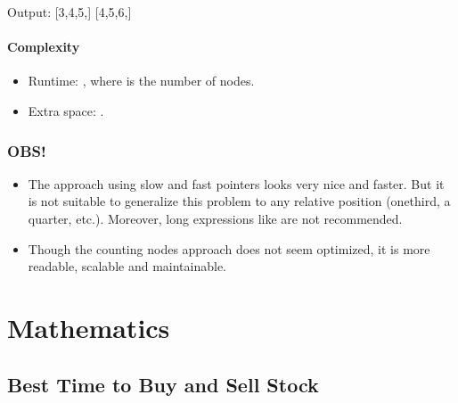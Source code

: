 \documentclass[letterpaper,12pt,english]{book}
\begin{document}
\begin{sphinxVerbatim}[commandchars=\\\{\}]
Output:
[3,4,5,]
[4,5,6,]
\end{sphinxVerbatim}


\subsubsection{Complexity}
\label{\detokenize{Two_Pointers/08_TP_876_Middle_of_the_Linked_List:id2}}\begin{itemize}
\item {} 
\sphinxAtStartPar
Runtime: , where  is the number of nodes.

\item {} 
\sphinxAtStartPar
Extra space: .

\end{itemize}


\subsection{OBS!}
\label{\detokenize{Two_Pointers/08_TP_876_Middle_of_the_Linked_List:obs}}\begin{itemize}
\item {} 
\sphinxAtStartPar
The approach using slow and fast pointers looks very nice and faster. But it is not suitable to generalize this problem to any relative position (one\sphinxhyphen{}third, a quarter, etc.). Moreover, long expressions like  are not recommended.

\item {} 
\sphinxAtStartPar
Though the counting nodes approach does not seem optimized, it is more readable, scalable and maintainable.

\end{itemize}

\sphinxstepscope


\chapter{Mathematics}
\label{\detokenize{Mathematics/index:mathematics}}\label{\detokenize{Mathematics/index::doc}}
\sphinxstepscope


\section{Best Time to Buy and Sell Stock}
\label{\detokenize{Mathematics/09_MTH_121_Best_Time_to_Buy_and_Sell_Stock:best-time-to-buy-and-sell-stock}}\label{\detokenize{Mathematics/09_MTH_121_Best_Time_to_Buy_and_Sell_Stock::doc}}
\end{document}
